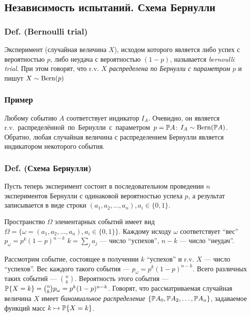 \subsection{Независимость испытаний. Схема
Бернулли}\label{ux43dux435ux437ux430ux432ux438ux441ux438ux43cux43eux441ux442ux44c-ux438ux441ux43fux44bux442ux430ux43dux438ux439.-ux441ux445ux435ux43cux430-ux431ux435ux440ux43dux443ux43bux43bux438}

\subsubsection{Def. (Bernoulli trial)}\label{def.-bernoulli-trial}

Эксперимент (случайная величина \(X\)), исходом которого является либо
успех с вероятностью \(p\), либо неудача с вероятностью \((1-p)\),
называется \emph{bernoulli trial}. При этом говорят, что r.v. \(X\)
\emph{распределена по Бернулли с параметром \(p\)} и пишут
\(X\sim\mathrm{Bern}(p)\)

\subsubsection{Пример}\label{ux43fux440ux438ux43cux435ux440}

Любому событию \(A\) соответствует индикатор \(I_A\). Очевидно, он
является \newline
\hbox{r.v. распределённой по Бернулли с параметром $p=\mathbb P A$}:
\(I_A\sim\mathrm{Bern}(\mathbb P A)\). Обратно, любая случайная величина с
распределением Бернулли является индикатором некоторого события.

\subsubsection{Def. (Схема
Бернулли)}\label{def.-ux441ux445ux435ux43cux430-ux431ux435ux440ux43dux443ux43bux43bux438}

Пусть теперь эксперимент состоит в последовательном проведении \(n\)
экспериментов Бернулли с одинаковой вероятностью успеха \(p\), а
результат записывается в виде строки
\((a_1, a_2, \ldots, a_n), a_i\in \{0,1\}\).

Пространство \(\Omega\) элементарных событий имеет вид
\(\Omega = \{ \omega = (a_1, a_2, \ldots, a_n), a_i\in \{0,1\} \}\).
Каждому исходу \(\omega\) соответствует ``вес''
\({p_\omega = p^k (1-p)^{n-k}}\) \(k=\sum_j a_j\) --- число ``успехов'',
\(n-k\) --- число ``неудач''.

Рассмотрим событие, состоящее в получении \(k\) ``успехов'' и r.v. \(X\)
--- число ``успехов''. Вес каждого такого события ---
\({p_\omega = p^k (1-p)^{n-k}}\). Всего различных таких событий ---
\(n \choose k\). Вероятность этого события ---
\(\mathbb P\{X=k\} = {n \choose k} {p_\omega = p^k (1-p)^{n-k}}\). Говорят,
что рассматриваемая случайная величина \(X\) имеет \emph{биномиальное
распределение} \(\{ \mathbb P A_0, \mathbb P A_2, \ldots, \mathbb P A_n \}\), задаваемое
функций масс \(k \mapsto \mathbb P\{X=k\}\).


